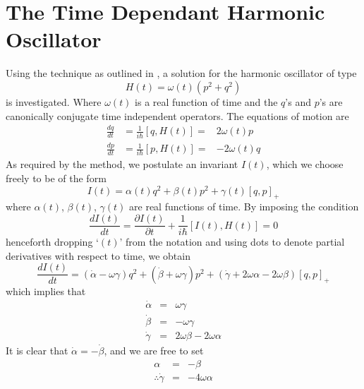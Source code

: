 \documentclass[11pt, a4paper, titlepage]{article}
\newcommand{\pd}{\partial}
\newcommand{\lb}{\left(}
\newcommand{\rb}{\right)}
\begin{document}
\section{The Time Dependant Harmonic Oscillator}
Using the technique as outlined in \cite{ref_td}, a solution for the
harmonic oscillator of type
\begin{equation}
  \label{eqn_tdhoH}
  H(t) = \omega(t) \lb p^2 + q^2 \rb
\end{equation}
is investigated. Where $\omega(t)$ is a real function of time and the
$q$'s and $p$'s are canonically conjugate time independent
operators. The equations of motion are
\begin{eqnarray}
  \label{eqn_tdhoqeom}
  \frac{d q}{dt} &= \frac{1}{i \hbar} [q, H(t)] =& 2 \omega(t) p \\
  \label{eqn_tdhopeom}
  \frac{d p}{dt} &= \frac{1}{i \hbar} [p, H(t)] =& - 2 \omega(t) q
\end{eqnarray}
As required by the method, we postulate an invariant $I(t)$, which we
choose freely to be of the form
\begin{equation}
  \label{eqn_tdhoI}
   I(t) = \alpha(t) q^2 + \beta(t) p^2 + \gamma(t) [q, p]_+
\end{equation}
where $\alpha(t)$, $\beta(t)$, $\gamma(t)$ are real functions of time. By imposing the condition
\begin{equation}
  \label{eqn_tdhoIdot}
  \frac{dI(t)}{dt} = \frac{\pd I(t)}{\pd t} + \frac{1}{i \hbar} [I(t), H(t)] = 0
\end{equation}
henceforth dropping `$(t)$' from the notation and using dots to denote
partial derivatives with respect to time, we obtain
\begin{equation}
  \label{eqn_tdhoIdotcondition}
   \frac{dI(t)}{dt} = (\dot{\alpha} - \omega \gamma)q^2 + (\dot{\beta} + \omega \gamma)p^2 + (\dot{\gamma} + 2 \omega \alpha -2 \omega \beta)[q, p]_+
\end{equation}
which implies that
\begin{eqnarray}
  \label{eqn_cnd1}
  \dot{\alpha} &=& \omega \gamma \\
  \label{eqn_cnd2}
  \dot{\beta} &=&  - \omega \gamma \\
  \label{eqn_cnd3}
  \dot{\gamma} &=& 2 \omega \beta - 2 \omega \alpha
\end{eqnarray}
It is clear that $\dot{\alpha} = - \dot{\beta}$, and we are free to set
\begin{eqnarray}
  \label{eqn_cnd4}
   \alpha &=& - \beta \\
  \label{eqn_cnd5}
   \therefore \dot{\gamma} &=& - 4 \omega \alpha
\end{eqnarray}
\end{document}

